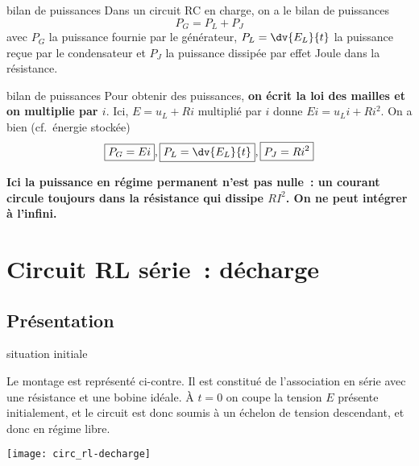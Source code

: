 \documentclass[../main/main.tex]{subfiles}
\begin{document}
\begin{tcbraster}[raster columns=2, raster equal height=rows]
    \begin{prop}[label=prop:rcpuiss-charge]{bilan de puissances}
        Dans un circuit RC en charge, on a le bilan de puissances
        \[ \boxed{P_G = P_L + P_J}\]
        avec $P_G$ la puissance fournie par le générateur, $P_L = \dv{E_L}{t}$
        la puissance reçue par le condensateur et $P_J$ la puissance dissipée
        par effet Joule dans la résistance.
    \end{prop}
    \begin{demo}[label=demo:rcpuiss-charge]{bilan de puissances}
        Pour obtenir des puissances, \textbf{on écrit la loi des mailles et on
        multiplie par $i$}. Ici, $E = u_L + Ri$ multiplié par $i$ donne $Ei =
        u_Li + Ri^2$. On a bien (cf.\ énergie stockée)
        \[\boxed{P_G = Ei}, \boxed{P_L = \dv{E_L}{t}}, \boxed{P_J=Ri^2}\]
    \end{demo}
\end{tcbraster}
\textbf{Ici la puissance en régime permanent n'est pas nulle~: un courant circule
toujours dans la résistance qui dissipe $RI^2$. On ne peut intégrer à l'infini.}

\section{Circuit RL série~: décharge}
\subsection{Présentation}
\begin{defi}[label=def:dechL, sidebyside, righthand width=.3\linewidth]
    {situation initiale}

    Le montage est représenté ci-contre. Il est constitué de l'association en
    série avec une résistance et une bobine idéale. À $t = 0$ on coupe la
    tension $E$ présente initialement, et le circuit est donc soumis à un
    échelon de tension descendant, et donc en régime libre.

    \tcblower
    \begin{center}
        \texttt{[image: circ\_rl-decharge]}
    \end{center}
\end{defi}
\end{document}
